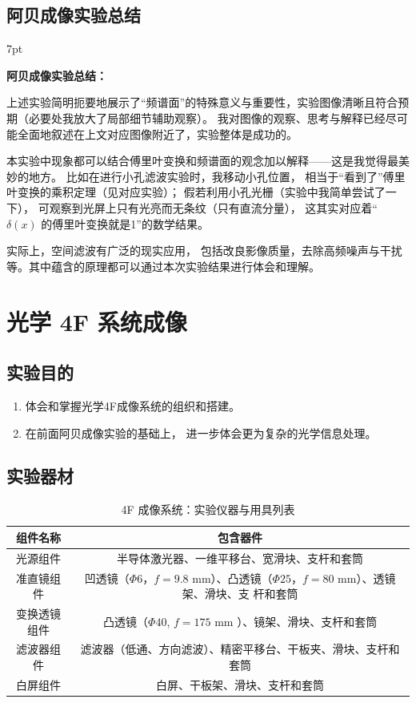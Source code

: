 \documentclass[UTF8]{article}
\theoremstyle{MyLineTheoremStyle} %
\theoremstyle{MyBlockTheoremStyle} %
\theoremstyle{MySubsubsectionStyle} %
\newenvironment{graybox}{%
        \def\FrameCommand{%
        \hspace{1pt}%
        {\color{gray}\vrule width 2pt}%
        {\color{graybox_color}\vrule width 4pt}%
        \colorbox{graybox_color}%
        }%
        \MakeFramed{\advance\hsize-\width\FrameRestore}%
        \noindent\hspace{-4.55pt}%
        \begin{adjustwidth}{}{7pt}%
        \vspace{2pt}\vspace{2pt}%
        }
        {%
        \vspace{2pt}\end{adjustwidth}\endMakeFramed%
        }
\begin{document}
\subsection{阿贝成像实验总结}

\begin{graybox}
\textbf{阿贝成像实验总结：}

上述实验简明扼要地展示了“频谱面”的特殊意义与重要性，实验图像清晰且符合预期（必要处我放大了局部细节辅助观察）。
我对图像的观察、思考与解释已经尽可能全面地叙述在上文对应图像附近了，实验整体是成功的。

本实验中现象都可以结合傅里叶变换和频谱面的观念加以解释——这是我觉得最美妙的地方。
比如在进行小孔滤波实验时，我移动小孔位置，
相当于“看到了”傅里叶变换的乘积定理（见对应实验）；
假若利用小孔光栅（实验中我简单尝试了一下），
可观察到光屏上只有光亮而无条纹（只有直流分量），
这其实对应着“ $\delta(x)$ 的傅里叶变换就是1”的数学结果。

实际上，空间滤波有广泛的现实应用，
包括改良影像质量，去除高频噪声与干扰等。其中蕴含的原理都可以通过本次实验结果进行体会和理解。
\end{graybox}



\section{光学 4F 系统成像}

\subsection{实验目的}
\begin{enumerate}
\item 体会和掌握光学4F成像系统的组织和搭建。
\item 在前面阿贝成像实验的基础上，
进一步体会更为复杂的光学信息处理。
\end{enumerate}

\subsection{实验器材}

\begin{table}[H]
    \centering
    \caption{4F 成像系统：实验仪器与用具列表}
    \begin{tabular}{cc}\toprule
        组件名称 & 包含器件\\  \midrule
        光源组件& 半导体激光器、一维平移台、宽滑块、支杆和套筒\\ 
        准直镜组件& 凹透镜（$\Phi 6$，$f=9.8$ mm）、凸透镜（$\Phi 25$，$f=80$ mm）、透镜架、滑块、支
        杆和套筒\\ 
        变换透镜组件& 凸透镜（$\Phi 40$, $f=175$ mm ）、镜架、滑块、支杆和套筒\\ 
        滤波器组件& 滤波器（低通、方向滤波）、精密平移台、干板夹、滑块、支杆和套筒\\
        白屏组件& 白屏、干板架、滑块、支杆和套筒\\ 
        \bottomrule
    \end{tabular}
\end{table}
\end{document}
